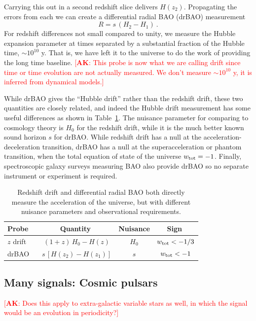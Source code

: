 \documentclass[preprint2, 10pt]{aastex}
\newcommand{\be}{\begin{equation}}
\newcommand{\ee}{\end{equation}}
\newcommand{\alex}[1]{\textcolor{red}{[{\bf AK}: #1]}}
\begin{document}
Carrying this out in a second redshift slice delivers $H(z_2)$.  Propagating 
the errors from each we can create a differential radial BAO (drBAO) 
measurement 
\be 
R=s\,(H_2-H_1) \ . \label{eq:drbao} 
\ee 
For redshift differences not small compared to unity, we measure the 
Hubble expansion parameter at times separated by a substantial fraction 
of the Hubble time, $\sim10^{10}$ y.  That is, we have left it to the universe 
to do the work of providing the long time baseline.  
\alex{This probe is now what we are calling drift since
time or time evolution are not actually measured.  We don't measure
 $\sim10^{10}$ y, it is inferred from dynamical models.}

While drBAO gives the 
``Hubble drift'' rather than the redshift drift, these two quantities are 
closely related, and indeed the Hubble drift measurement has some 
useful differences as shown in Table~\ref{tab:drbao}.  The nuisance 
parameter for comparing to cosmology theory is $H_0$ for the redshift 
drift, while it is the much better known sound horizon $s$ for drBAO.  
While redshift drift has a null at the acceleration-deceleration transition, 
drBAO has a null at the superacceleration or phantom transition, when the 
total equation of state of the universe $w_{\rm tot}=-1$.  Finally, 
spectroscopic galaxy surveys measuring BAO also provide drBAO so no 
separate instrument or experiment is required. 


\begin{table}[!htb]
\footnotesize
\begin{tabular}{l|ccc} 
Probe \ & \ Quantity \ & Nuisance & \ Sign \ \\ 
\hline 
$z$ drift &$(1+z)\,H_0-H(z)$ & $H_0$ & $w_{\rm tot}<-1/3$ \\ 
drBAO & $s\,[H(z_2)-H(z_1)]$ & $s$ & $w_{\rm tot}<-1$ \\ 
\end{tabular} 
\caption{Redshift drift and differential radial BAO both 
directly measure the acceleration of the universe, but with different 
nuisance parameters and observational requirements. 
}
\label{tab:drbao}
\end{table} 


\subsection{Many signals: Cosmic pulsars} 
\alex{Does this apply to extra-galactic variable stars as well, in which the signal would be
an evolution in periodicity?}
\end{document}
